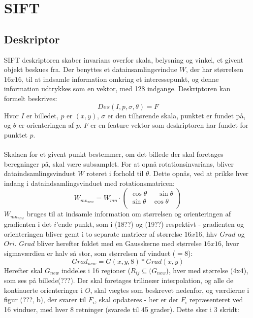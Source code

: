 \section{SIFT}

\subsection{Deskriptor}
SIFT deskriptoren skaber invarians overfor skala, belysning og vinkel, et givent objekt beskues fra. Der benyttes et datainsamlingsvindue $W$, der har størrelsen $16x16$, til at indsamle information omkring et interessepunkt, og denne information udtrykkes som en vektor, med 128 indgange. Deskriptoren kan formelt beskrives:
\begin{equation}
Des(I, p,\sigma,\theta) = F
\end{equation}
Hvor $I$ er billedet, $p$ er $(x,y)$, $\sigma$ er den tilhørende skala, punktet er fundet på, og $\theta$ er orienteringen af $p$. $F$ er en feature vektor som deskriptoren har fundet for punktet $p$.
\\
\\
Skalaen for et givent punkt bestemmer, om det billede der skal foretages beregninger på, skal være subsamplet. For at opnå rotationsinvarians, bliver dataindsamlingsvinduet $W$ roteret i forhold til $\theta$. Dette opnås, ved at prikke hver indang i dataindsamlingsvinduet med rotationsmatricen:
\begin{equation}
W_{{mn}_{new}} = W_{mn} \cdot
\begin{pmatrix}
  \cos \theta & -\sin \theta \\
  \sin \theta & \cos \theta  \\
\end{pmatrix}
\label{rotaionmatrix}
\end{equation}
$W_{{mn}_{new}}$ bruges til at indsamle information om størrelsen og orienteringen af gradienten i det $i$'ende punkt, som i (18??) og (19??) respektivt - gradienten og orienteringen bliver gemt i to separate matricer af størrelse $16x16$, hhv $Grad$ og $Ori$. $Grad$ bliver herefter foldet med en Gausskerne med størrelse $16x16$, hvor sigmaværdien er halv så stor, som størrelsen af vinduet ($=8$):
\begin{equation}
Grad_{new} = G(x,y,8) * Grad(x,y)
\label{gradientsmooth}
\end{equation}
Herefter skal $G_{new}$ inddeles i 16 regioner ($R_{ij} \subseteq (G_{new}$), hver med størrelse (4x4), som ses på billede(???). Der skal foretages trilineær interpolation, og alle de kontinuerte orienteringer i $O$, skal vægtes som beskrevet nedenfor, og værdierne i figur (???, b), der svarer til $F_i$, skal opdateres - her er der $F_i$ repræsenteret ved 16 vinduer, med hver 8 retninger (svarede til 45 grader). Dette sker i 3 skridt:

